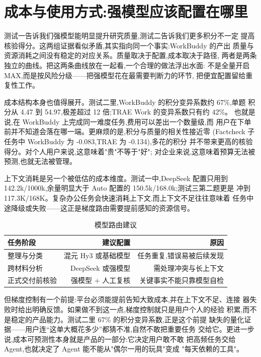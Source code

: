 \documentclass[
  12pt,
  a4paper,
  oneside,
  headings=normal,
  numbers=noendperiod,
  listof=totoc,
  bibliography=totoc
]{scrreprt}
\newenvironment{hfhtable}[1][htbp]
  {\begin{table}[#1]\centering\footnotesize\setstretch{1}}
  {\end{table}}
\newcommand{\source}[1]{%
  \par\vspace{3pt}{\footnotesize
    数据来源: #1\par}}
\begin{document}
\chapter{成本与使用方式:强模型应该配置在哪里}

测试一告诉我们强模型能明显提升研究质量,测试二告诉我们更多积分不一定
提高核验得分。这两组证据看似矛盾,其实指向同一个事实:WorkBuddy 的产出
质量与资源消耗之间没有稳定的对应关系。质量取决于配置,成本取决于路径,
两者是两条独立的曲线。把这两条曲线放在一起看,一个合理的做法浮出水面:
不是全量开启 MAX,而是按风险分级——把强模型花在最需要判断力的环节,
把便宜配置留给重复性工作。

成本结构本身也值得展开。测试二里,WorkBuddy 的积分变异系数约 67\%,单题
积分从 4.47 到 54.97,极差超过 12 倍;TRAE Work 的变异系数只有约 42\%。
也就是说,在 WorkBuddy 上完成同一难度任务,费用可以差出一个数量级,而
用户在下单前并不知道会落在哪一端。更麻烦的是,积分与质量的相关性接近零
(Factcheck 子任务中 WorkBuddy 为 -0.083,TRAE 为 -0.134),多花的积分
并不带来更高的核验得分。对个人用户来说,这意味着"贵"不等于"好";
对企业来说,这意味着预算无法被预测,也就无法被管理。

上下文消耗是另一个被低估的成本维度。测试一中,DeepSeek 配置只用到
142.2k/1000k,余量明显大于 Auto 配置的 150.5k/168.0k;测试三第二题更是
冲到 117.3K/168K。复杂办公任务会快速消耗上下文,而上下文不足往往意味着
任务中途降级或失败——这正是梯度路由需要提前感知的资源信号。

\begin{hfhtable}
  \caption{模型路由建议}
  \label{tab:routing}
  \begin{tabularx}{\textwidth}{@{}Yrr@{}}
    \toprule
    \textbf{任务阶段} & \textbf{建议配置} & \textbf{原因} \\
    \midrule
    整理与分类 & 混元 Hy3 或基础模型 & 任务重复,错误易被后续发现 \\
    跨材料分析 & DeepSeek 或强模型 & 需处理冲突与长上下文 \\
    正式交付前核验 & 强模型 + 人工复核 & 关键事实不能只靠模型自检 \\
    \bottomrule
  \end{tabularx}
  \source{基于测试一、二结果的配置建议}
\end{hfhtable}

但梯度控制有一个前提:平台必须能提前告知大致成本,并在上下文不足、连接
器失败时给出明确反馈。如果做不到这一点,梯度控制就只是用户个人的经验
积累,而不是稳定的产品能力。测试二里 67\% 的积分变异系数,正是这个前提
缺失的量化证据——用户连“这单大概花多少”都猜不准,自然不敢把重要任务
交给它。更进一步说,成本可预测性本身就是产品的一部分:它决定用户敢不敢
把高频任务交给 Agent,也就决定了 Agent 能不能从"偶尔一用的玩具"变成
"每天依赖的工具"。
\end{document}
